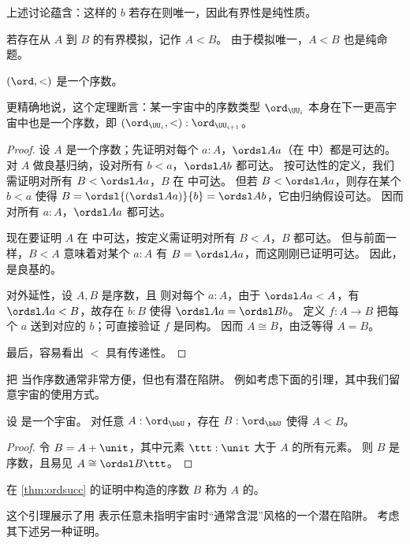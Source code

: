 上述讨论蕴含：这样的 $b$ 若存在则唯一，因此有界性是纯性质。

若存在从 $A$ 到 $B$ 的有界模拟，记作 $A<B$。
由于模拟唯一，$A<B$ 也是纯命题。

\begin{thm}\label{thm:ordord}
  $(\ord,<)$ 是一个序数。
\end{thm}

\noindent
更精确地说，这个定理断言：某一宇宙中的序数类型 $\ord_{\UU_i}$ 本身在下一更高宇宙中也是一个序数，即 $(\ord_{\UU_i},<):\ord_{\UU_{i+1}}$。

\begin{proof}
  设 $A$ 是一个序数；先证明对每个 $a:A$，$\ordsl A a$（在 \ord 中）都是可达的。
  对 $A$ 做良基归纳，设对所有 $b<a$，$\ordsl A b$ 都可达。
  按可达性的定义，我们需证明对所有 $B<\ordsl A a$，$B$ 在 \ord 中可达。
  但若 $B<\ordsl A a$，则存在某个 $b<a$ 使得 $B = \ordsl{(\ordsl A a)}{b} = \ordsl A b$，它由归纳假设可达。
  因而对所有 $a:A$，$\ordsl A a$ 都可达。

  现在要证明 $A$ 在 \ord 中可达，按定义需证明对所有 $B<A$，$B$ 都可达。
  但与前面一样，$B<A$ 意味着对某个 $a:A$ 有 $B=\ordsl A a$，而这刚刚已证明可达。
  因此，\ord 是良基的。

  对外延性，设 $A,B$ 是序数，且
  则对每个 $a:A$，由于 $\ordsl A a<A$，有 $\ordsl A a<B$，故存在 $b:B$ 使得 $\ordsl A a = \ordsl B b$。
  定义 $f:A\to B$ 把每个 $a$ 送到对应的 $b$；可直接验证 $f$ 是同构。
  因而 $A\cong B$，由泛等得 $A=B$。

  最后，容易看出 $<$ 具有传递性。
\end{proof}

把 \ord 当作序数通常非常方便，但也有潜在陷阱。
例如考虑下面的引理，其中我们留意宇宙的使用方式。

\begin{lem}\label{thm:ordsucc}
  设 \bbU 是一个宇宙。
  对任意 $A:\ord_\bbU$，存在 $B:\ord_\bbU$ 使得 $A<B$。
\end{lem}
\begin{proof}
  令 $B=A+\unit$，其中元素 $\ttt:\unit$ 大于 $A$ 的所有元素。
  则 $B$ 是序数，且易见 $A\cong \ordsl B \ttt$。
\end{proof}

在 \cref{thm:ordsucc} 的证明中构造的序数 $B$ 称为 $A$ 的。

这个引理展示了用 \UU 表示任意未指明宇宙时“通常含混”风格的一个潜在陷阱。
考虑其下述另一种证明。

